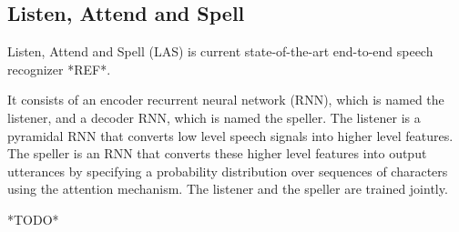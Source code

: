 \subsection{Listen, Attend and Spell}

Listen, Attend and Spell (LAS) is current state-of-the-art end-to-end speech recognizer *REF*.

It consists of an encoder recurrent neural network (RNN), which is named the listener, and a decoder RNN, which is named the speller.
The listener is a pyramidal RNN that converts low level speech signals into higher level features.
The speller is an RNN that converts these higher level features into output utterances by specifying a probability distribution over sequences of characters using the attention mechanism.
The listener and the speller are trained jointly.

*TODO*
